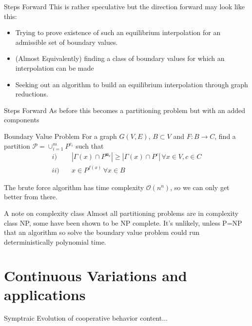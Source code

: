 \documentclass{beamer}
\DeclareMathOperator{\uu}{\mathbf{u}}
\begin{document}
\begin{frame}{Steps Forward}
	This is rather speculative but the direction forward may look like this:
	\begin{itemize}
		\item Trying to prove existence of such an equilibrium interpolation for an admissible set of boundary values. 
		\item (Almost Equivalently) finding a class of boundary values for which an interpolation can be made
		\item Seeking out an algorithm to build an equilibrium interpolation through graph reductions.  
	\end{itemize}
\end{frame}
\begin{frame}{Steps Forward}
	As before this becomes a partitioning problem but with an added components
	\begin{block}{Boundary Value Problem }
		For a graph $G(V,E)$, $B\subset V$ and $F:B\rightarrow C$, find a partition $\mathcal{P}=\cup_{i=1}^mP^{c_i}$ such that 
		\begin{equation}
			\begin{split}
				i)\quad & |\Gamma(x)\cap P^{\uu_x}|\geq |\Gamma(x)\cap P^{c}|\,\forall x\in V, c\in C \\
				ii)\quad &  x\in P^{f(x)}\,\forall x\in B 
			\end{split}
		\end{equation}
	\end{block}
	The brute force algorithm has time complexity $\mathcal{O}(n^n)$, so we can only get better from there. 
\end{frame}
\begin{frame}
	{A note on complexity class}
	Almost all partitioning problems are in complexity class NP, some have been shown to be NP complete. It's unlikely, unless P=NP that an algorithm so solve the boundary value problem could run deterministically polynomial time.
\end{frame}
\section{Continuous Variations and applications}
\begin{frame}{Symptraic Evolution of cooperative behavior}
	content...
\end{frame}
\end{document}
